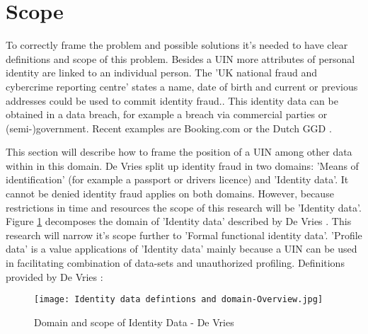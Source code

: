\section{Scope}
To correctly frame the problem and possible solutions it's needed to have clear definitions and scope of this problem. Besides a UIN more attributes of personal identity are linked to an individual person. The 'UK national fraud and cybercrime reporting centre' states a name, date of birth and current or previous addresses could be used to commit identity fraud.\cite{Action_fraud}. This identity data can be obtained in a data breach, for example a breach via commercial parties or (semi-)government. Recent examples are Booking.com \cite{Booking_databreach} or the Dutch GGD \cite{GGD_databreach}.

This section will describe how to frame the position of a UIN among other data within in this domain.
De Vries \etal \cite{Vries2007IdentiteitsfraudeEA} split up identity fraud in two domains: 'Means of identification' (for example a passport or drivers licence) and 'Identity data'. It cannot be denied identity fraud applies on both domains. However, because restrictions in time and resources the scope of this research will be 'Identity data'.
Figure \ref{fig:ID_domain} decomposes the domain of 'Identity data' described by De Vries \etal. This research will narrow it's scope further to 'Formal functional identity data'. 'Profile data' is a value applications of 'Identity data' mainly because a UIN can be used in facilitating combination of data-sets and unauthorized profiling. Definitions provided by De Vries \etal: 
\graphicspath{ {./images/} }
\begin{figure}
\texttt{[image: Identity data defintions and domain-Overview.jpg]}\\
\caption{Domain and scope of Identity Data - De Vries \etal \cite{Vries2007IdentiteitsfraudeEA}}
\label{fig:ID_domain}
\end{figure}
